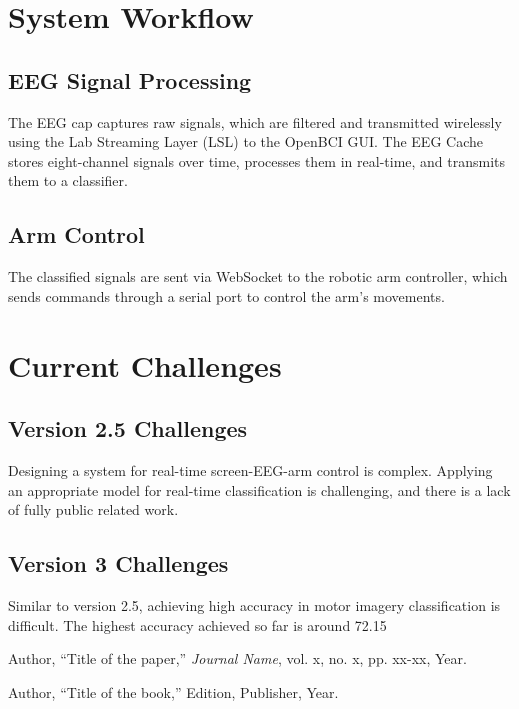 \documentclass[12pt]{report}
\begin{document}
\chapter{System Workflow}
\section{EEG Signal Processing}
The EEG cap captures raw signals, which are filtered and transmitted wirelessly using the Lab Streaming Layer (LSL) to the OpenBCI GUI. The EEG Cache stores eight-channel signals over time, processes them in real-time, and transmits them to a classifier.

\section{Arm Control}
The classified signals are sent via WebSocket to the robotic arm controller, which sends commands through a serial port to control the arm's movements.

\chapter{Current Challenges}
\section{Version 2.5 Challenges}
Designing a system for real-time screen-EEG-arm control is complex. Applying an appropriate model for real-time classification is challenging, and there is a lack of fully public related work.

\section{Version 3 Challenges}
Similar to version 2.5, achieving high accuracy in motor imagery classification is difficult. The highest accuracy achieved so far is around 72.15%

\begin{thebibliography}{99}
Author, ``Title of the paper,'' \textit{Journal Name}, vol. x, no. x, pp. xx-xx, Year.

Author, ``Title of the book,'' Edition, Publisher, Year.
\end{thebibliography}
\end{document}
